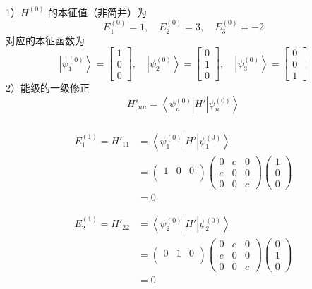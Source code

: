 \begin{frame}
  \frametitle{}
1）$ H^{(0)}  $ 的本征值（非简并）为
\[ E^{(0)}_1 = 1, \quad E^{(0)}_2 = 3, \quad E^{(0)}_3 = -2\]  
对应的本征函数为
\[ \left\vert \psi^{(0)}_1\right\rangle  = \begin{bmatrix}
  1  \\
  0  \\
  0  
\end{bmatrix} , \quad \left\vert \psi^{(0)}_2 \right\rangle  = \begin{bmatrix}
  0  \\
  1  \\
  0  
\end{bmatrix} , \quad
\left\vert \psi^{(0)}_3 \right\rangle  = \begin{bmatrix}
  0  \\
  0  \\
  1  
\end{bmatrix} \] 
2）能级的一级修正
\[ H'_{nn} = \left\langle\psi^{(0)}_n \right\vert H' \left\vert \psi^{(0)}_n \right\rangle\]
\end{frame} 

\begin{frame}
  \frametitle{}
\[ 
\begin{aligned}
  E^{(1)}_1 = H'_{11} &= \left\langle \psi^{(0)}_1 \right\vert H' \left\vert \psi^{(0)}_1 \right\rangle \\ 
  &= \begin{pmatrix}
    1 & 0 & 0  \\ 
  \end{pmatrix} 
  \begin{pmatrix}
    0 & c & 0  \\
    c & 0 & 0  \\
    0 & 0 & c  
  \end{pmatrix} 
  \begin{pmatrix}
    1  \\
    0  \\
    0  
  \end{pmatrix} \\
  &=0 
\end{aligned}  
\]

\[ 
\begin{aligned}
  E^{(1)}_2 = H'_{22} &= \left\langle \psi^{(0)}_2 \right\vert H' \left\vert \psi^{(0)}_2 \right\rangle \\ 
  &= \begin{pmatrix}
    0 & 1 & 0  \\ 
  \end{pmatrix} 
  \begin{pmatrix}
    0 & c & 0  \\
    c & 0 & 0  \\
    0 & 0 & c  
  \end{pmatrix} 
  \begin{pmatrix}
    0  \\
    1  \\
    0  
  \end{pmatrix} \\
  &=0 
\end{aligned}  
\]
\end{frame} 

